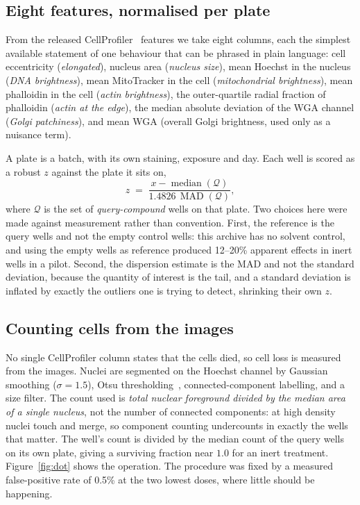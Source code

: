 \documentclass[11pt]{article}
\begin{document}
\subsection{Eight features, normalised per plate}

From the released CellProfiler~\citep{carpenter2006cellprofiler} features we take eight
columns, each the simplest available statement of one behaviour that can be phrased in
plain language: cell eccentricity (\emph{elongated}), nucleus area (\emph{nucleus
size}), mean Hoechst in the nucleus (\emph{DNA brightness}), mean MitoTracker in the
cell (\emph{mitochondrial brightness}), mean phalloidin in the cell (\emph{actin
brightness}), the outer-quartile radial fraction of phalloidin (\emph{actin at the
edge}), the median absolute deviation of the WGA channel (\emph{Golgi patchiness}), and
mean WGA (overall Golgi brightness, used only as a nuisance term).

A plate is a batch, with its own staining, exposure and day. Each well is scored as a
robust $z$ against the plate it sits on,
\begin{equation}
z \;=\; \frac{x - \operatorname{median}(\mathcal{Q})}{1.4826\,\operatorname{MAD}(\mathcal{Q})},
\end{equation}
where $\mathcal{Q}$ is the set of \emph{query-compound} wells on that plate. Two choices
here were made against measurement rather than convention. First, the reference is the
query wells and not the empty control wells: this archive has no solvent control, and
using the empty wells as reference produced 12--20\% apparent effects in inert wells in
a pilot. Second, the dispersion estimate is the MAD and not the standard deviation,
because the quantity of interest is the tail, and a standard deviation is inflated by
exactly the outliers one is trying to detect, shrinking their own $z$.

\subsection{Counting cells from the images}
\label{sec:counting}

No single CellProfiler column states that the cells died, so cell loss is measured from
the images. Nuclei are segmented on the Hoechst channel by Gaussian smoothing
($\sigma=1.5$), Otsu thresholding~\citep{otsu1979threshold}, connected-component
labelling, and a size filter. The count used is \emph{total nuclear foreground divided
by the median area of a single nucleus}, not the number of connected components:
at high density nuclei touch and merge, so component counting undercounts in exactly
the wells that matter. The well's count is divided by the median count of the query
wells on its own plate, giving a surviving fraction near $1.0$ for an inert treatment.
Figure~\ref{fig:dot} shows the operation. The procedure was fixed by a measured
false-positive rate of 0.5\% at the two lowest doses, where little should be happening.
\end{document}

